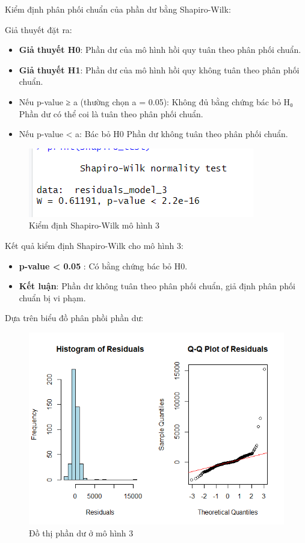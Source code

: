 Kiểm định phân phối chuẩn của phần dư bằng Shapiro-Wilk:

Giả thuyết đặt ra:
\begin{itemize}
  \item\textbf{Giả thuyết H0}: Phần dư của mô hình hồi quy tuân theo phân phối chuẩn.
  \item\textbf{Giả thuyết H1}: Phần dư của mô hình hồi quy không tuân theo phân phối chuẩn.
  \item Nếu p-value ≥ a (thường chọn a = 0.05): Không đủ bằng chứng bác bỏ H₀ \rightarrow Phần dư có thể coi là tuân theo phân phối chuẩn.
  \item Nếu p-value < a: Bác bỏ H0 \leftarrow Phần dư không tuân theo phân phối chuẩn.
\end{itemize}

\begin{figure}[H]
  \centering
  \includegraphics[width=0.7\linewidth]{graphics/5.5.6.png}
  \caption{Kiểm định Shapiro-Wilk mô hình 3 }
\end{figure}

Kết quả kiểm định Shapiro-Wilk cho mô hình 3:
\begin{itemize}
  \item\textbf{p-value < 0.05 }: Có bằng chứng bác bỏ H0.
  \item\textbf{Kết luận}: Phần dư không tuân theo phân phối chuẩn, giả định phân phối chuẩn bị vi phạm.
\end{itemize}

Dựa trên biểu đồ phân phồi phần dư:
\begin{figure}[H]
  \centering
  \includegraphics[width=0.5\linewidth]{graphics/5.5.9.png}
  \caption{Đồ thị phần dư ở mô hình 3}
\end{figure}

